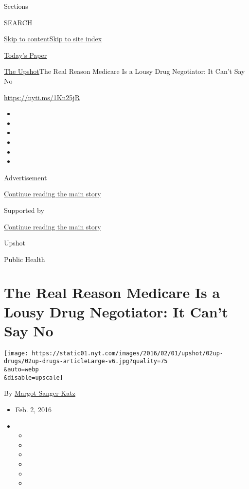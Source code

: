 Sections

SEARCH

\protect\hyperlink{site-content}{Skip to
content}\protect\hyperlink{site-index}{Skip to site index}

\href{https://myaccount.nytimes.com/auth/login?response_type=cookie\&client_id=vi}{}

\href{https://www.nytimes.com/section/todayspaper}{Today's Paper}

\href{/section/upshot}{The Upshot}\textbar{}The Real Reason Medicare Is
a Lousy Drug Negotiator: It Can't Say No

\url{https://nyti.ms/1Kn25jR}

\begin{itemize}
\item
\item
\item
\item
\item
\item
\end{itemize}

Advertisement

\protect\hyperlink{after-top}{Continue reading the main story}

Supported by

\protect\hyperlink{after-sponsor}{Continue reading the main story}

Upshot

Public Health

\hypertarget{the-real-reason-medicare-is-a-lousy-drug-negotiator-it-cant-say-no}{%
\section{The Real Reason Medicare Is a Lousy Drug Negotiator: It Can't
Say
No}\label{the-real-reason-medicare-is-a-lousy-drug-negotiator-it-cant-say-no}}

\texttt{[image: https://static01.nyt.com/images/2016/02/01/upshot/02up-drugs/02up-drugs-articleLarge-v6.jpg?quality=75\\\&auto=webp\\\&disable=upscale]}

By \href{http://www.nytimes.com/by/margot-sanger-katz}{Margot
Sanger-Katz}

\begin{itemize}
\item
  Feb. 2, 2016
\item
  \begin{itemize}
  \item
  \item
  \item
  \item
  \item
  \item
  \end{itemize}
\end{itemize}


